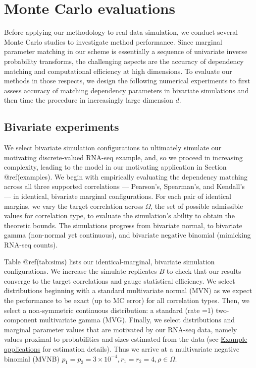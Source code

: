 \documentclass[
]{jss}
\begin{document}
\hypertarget{simulations}{%
\section{Monte Carlo evaluations}\label{simulations}}

Before applying our methodology to real data simulation, we conduct
several Monte Carlo studies to investigate method performance. Since
marginal parameter matching in our scheme is essentially a sequence of
univariate inverse probability transforms, the challenging aspects are
the accuracy of dependency matching and computational efficiency at high
dimensions. To evaluate our methods in those respects, we design the
following numerical experiments to first assess accuracy of matching
dependency parameters in bivariate simulations and then time the
procedure in increasingly large dimension \(d\).

\hypertarget{bivariate-experiments}{%
\subsection{Bivariate experiments}\label{bivariate-experiments}}

We select bivariate simulation configurations to ultimately simulate our
motivating discrete-valued RNA-seq example, and, so we proceed in
increasing complexity, leading to the model in our motivating
application in Section @ref(examples). We begin with empirically
evaluating the dependency matching across all three supported
correlations --- Pearson's, Spearman's, and Kendall's --- in identical,
bivariate marginal configurations. For each pair of identical margins,
we vary the target correlation across \(\Omega\), the set of possible
admissible values for correlation type, to evaluate the simulation's
ability to obtain the theoretic bounds. The simulations progress from
bivariate normal, to bivariate gamma (non-normal yet continuous), and
bivariate negative binomial (mimicking RNA-seq counts).

Table @ref(tab:sims) lists our identical-marginal, bivariate simulation
configurations. We increase the simulate replicates \(B\) to check that
our results converge to the target correlations and gauge statistical
efficiency. We select distributions beginning with a standard
multivariate normal (MVN) as we expect the performance to be exact (up
to MC error) for all correlation types. Then, we select a non-symmetric
continuous distribution: a standard (rate =1) two-component multivariate
gamma (MVG). Finally, we select distributions and marginal parameter
values that are motivated by our RNA-seq data, namely values proximal to
probabilities and sizes estimated from the data (see
\href{examples}{Example applications} for estimation details). Thus we
arrive at a multivariate negative binomial (MVNB)
\(p_1 = p_2 = 3\times10^{-4}, r_1 = r_2 = 4, \rho \in \Omega\).
\end{document}
